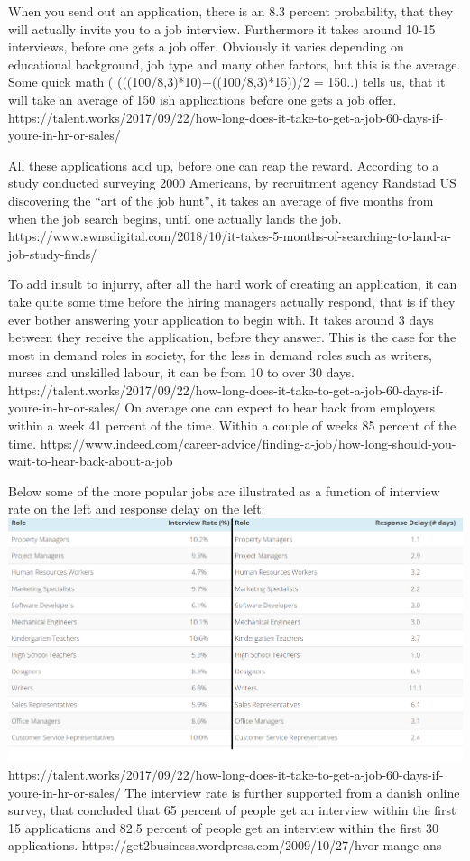 When you send out an application, there is an 8.3 percent probability, that
they will actually invite you to a job interview. Furthermore it takes around
10-15 interviews, before one gets a job offer. Obviously it varies depending
on educational background, job type and many other factors, but this is the average.
Some quick math ( (((100/8,3)*10)+((100/8,3)*15))/2 = 150..) tells us, that it will
take an average of 150 ish applications before one gets a job offer.
https://talent.works/2017/09/22/how-long-does-it-take-to-get-a-job-60-days-if-youre-in-hr-or-sales/

All these applications add up, before one can reap the reward. According to a
study conducted surveying 2000 Americans, by recruitment agency Randstad US
discovering the “art of the job hunt”, it takes an average of five
months from when the job search begins, until one actually lands
the job.
https://www.swnsdigital.com/2018/10/it-takes-5-months-of-searching-to-land-a-job-study-finds/

To add insult to injurry, after all the hard work of creating an application, it can
take quite some time before the hiring managers actually respond, that is if they ever
bother answering your application to begin with.
It takes around 3 days between they receive the application, before they answer.
This is the case for the most in demand roles in society, for the less in demand roles
such as writers, nurses and unskilled labour, it can be from 10 to over 30 days.
https://talent.works/2017/09/22/how-long-does-it-take-to-get-a-job-60-days-if-youre-in-hr-or-sales/
On average one can expect to hear back from employers within a week 41 percent
of the time. Within a couple of weeks 85 percent of the time.
https://www.indeed.com/career-advice/finding-a-job/how-long-should-you-wait-to-hear-back-about-a-job

Below some of the more popular jobs are illustrated as a function of interview
rate on the left and response delay on the left:
\includegraphics{figures/interviewratexdelay.png}
https://talent.works/2017/09/22/how-long-does-it-take-to-get-a-job-60-days-if-youre-in-hr-or-sales/
The interview rate is further supported from a danish online survey, that concluded
that 65 percent of people get an interview within the first 15 applications and
 82.5 percent of people get an interview within the first 30 applications.
 https://get2business.wordpress.com/2009/10/27/hvor-mange-ans%

